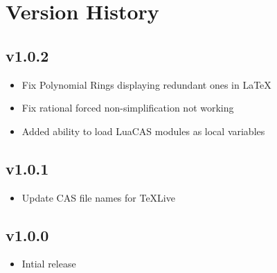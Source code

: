 \documentclass{article}
\begin{document}
\section{Version History}

\subsection*{v1.0.2}

\begin{itemize}
    \item Fix Polynomial Rings displaying redundant ones in \LaTeX{}
    \item Fix rational forced non-simplification not working
    \item Added ability to load LuaCAS modules as local variables
\end{itemize}

\subsection*{v1.0.1}

\begin{itemize}
    \item Update CAS file names for \TeX{}Live
\end{itemize}

\subsection*{v1.0.0}

\begin{itemize}
    \item Intial release
\end{itemize}
\end{document}
